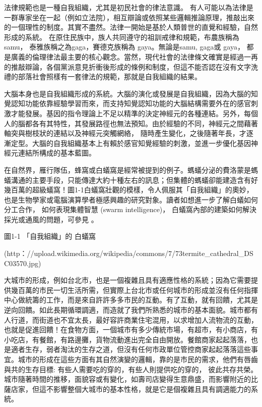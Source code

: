 法律規範也是一種自我組織，尤其是初民社會的律法意識。 有人可能以為法律是一群專家坐在一起（例如立法院），相互辯論或依照某些邏輯推論原理，推敲出來的一個理性的制度。其實不盡然。法律一開始是基於人類普世的直覺和經驗，自然形成的系統。 在原住民族中，族人共同遵守的祖訓戒律和規範，布農族稱為 samu， 泰雅族稱之為gaga，賽德克族稱為 gaya。無論是samu, gaga或 gaya， 都是廣義的倫理律法最主要的核心觀念。當然，現代社會的法律條文確實是經過一再的推敲辯論，各個黨派意見折衝後形成的條例和制度，但這不能否認在沒有文字洗禮的部落社會照樣有一套律法的規範，那就是自我組織的結果。  

大腦本身也是自我組織形成的系統。大腦的演化或發展是自我組織，因為大腦的知覺認知功能依靠經驗學習而來，而支持知覺認知功能的大腦結構需要外在的感官刺激才能發展。基因的指令理論上不足以精準的決定神經元的各種連結。另外，每個人的腦都各有其特性，其發展路徑也無法預知。由於經驗的不同，神經元之間藉著軸突與樹枝狀的連結以及神經元突觸網絡， 隨時產生變化，之後隨著年長，才逐漸定型。大腦的自我組織基本上有賴於感官知覺經驗的刺激，並進一步優化基因神經元連結所構成的基本藍圖。

在自然界，雁行隊伍，蜂窩或白蟻窩是經常被提到的例子。螞蟻分泌的費洛蒙是螞蟻溝通的主要手段，只能傳達大約十種左右的訊息；但集體的螞蟻卻能建造含有好幾百萬的超級蟻窩！圖1-1白蟻窩壯觀的模樣，令人佩服其「自我組織」的奧妙，也是生物學家或電腦演算學者極感興趣的研究對象。讀者如想進一步了解白蟻如何分工合作， 如何表現集體智慧 (swarm intelligence)， 白蟻窩內部的建築如何解決採光或通風的問題，可參見 \citet{Margonelli2012}。




圖1-1 「自我組織」的 白蟻窩

(http：//upload.wikimedia.org/wikipedia/commons/7/73termite\_cathedral\_DSC03570.jpg)

大城市的形成，例如台北市，也是一個複雜且具有適應性格的系統；因為它需要提供幾百萬的市民一切生活所需，但實際上台北市或任何城市的形成並沒有任何指揮中心做統籌的工作，而是來自許許多多市民的互動。有了互動，就有回饋，尤其是逆向回饋。如此長期循環調適，而造就了我們所熟悉的城市的基本面貌。城市都有人行道，而街道也不宜太長，最好容許商業住宅混用，以求增加人流物流的互動，也就是促進回饋！在食物方面，一個城市有多少傳統市場，有超市，有小商店，有小吃店，有餐館，有路邊攤，貨物流動進出完全自由開放。餐館商家起起落落，也是適者生存，弱者淘汰的生存之道，但沒有任何市政單位管控商家起起落落這些事宜。城市的形成在這些方面有其自然演變的邏輯，靠的是市民的需求，他們有唇齒與共的生存目標: 有些人需要吃的穿的，有些人則提供吃的穿的， 彼此共存共榮。城市隨著時間的推移，面貌容或有變化，如壽司店變得生意鼎盛，而影響附近的比薩店家，但這不影響整個大城市的基本性格，就是它是個複雜且具有調適能力的系統。

